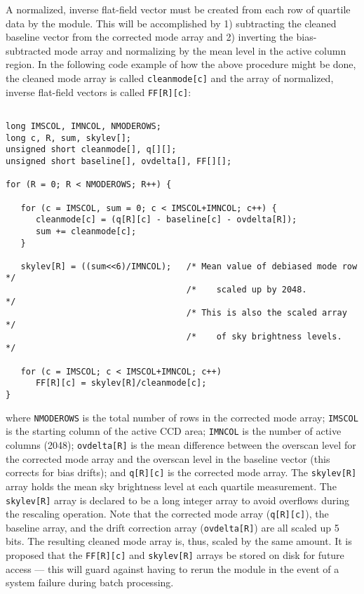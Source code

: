 A normalized, inverse flat-field vector must be created from
each row of quartile data by the \icfrm module. This will be accomplished
by 1) subtracting the cleaned baseline vector
from the corrected mode array and 2) inverting the bias-subtracted
mode array and normalizing by the mean level in the active
column region. In the following code example of how the above
procedure might be done, the cleaned mode array is called
{\tt cleanmode[c]} and the array of normalized, inverse flat-field
vectors is called {\tt FF[R][c]}:

\begin{verbatim}

long IMSCOL, IMNCOL, NMODEROWS;
long c, R, sum, skylev[];
unsigned short cleanmode[], q[][];
unsigned short baseline[], ovdelta[], FF[][];

for (R = 0; R < NMODEROWS; R++) {

   for (c = IMSCOL, sum = 0; c < IMSCOL+IMNCOL; c++) {
      cleanmode[c] = (q[R][c] - baseline[c] - ovdelta[R]);
      sum += cleanmode[c];
   }

   skylev[R] = ((sum<<6)/IMNCOL);   /* Mean value of debiased mode row */
                                    /*    scaled up by 2048.           */
                                    /* This is also the scaled array   */
                                    /*    of sky brightness levels.    */

   for (c = IMSCOL; c < IMSCOL+IMNCOL; c++) 
      FF[R][c] = skylev[R]/cleanmode[c]; 
}

\end{verbatim}

\noindent where {\tt NMODEROWS} is the total number of rows in the 
corrected mode array; 
{\tt IMSCOL} is the starting column of the active
CCD area; {\tt IMNCOL} is the number of active columns
(2048); {\tt ovdelta[R]} is the mean difference between the  
overscan level for the corrected mode array and the
overscan level in the baseline vector (this corrects for bias
drifts); and {\tt q[R][c]} is the corrected mode array.
The {\tt skylev[R]} array holds the mean sky brightness level
at each quartile measurement. The {\tt skylev[R]} array is
declared to be a long integer array to avoid overflows during
the rescaling operation.
Note that the corrected mode array ({\tt q[R][c]}), the baseline array,
and the drift correction array ({\tt ovdelta[R]}) are all scaled up 5 bits.
The resulting cleaned mode array is, thus, scaled by the same amount.
It is proposed that the {\tt FF[R][c]} and {\tt skylev[R]}
arrays be stored on
disk for future access --- this will guard against having to rerun
the \icfrm module in the event of a system failure during
\cfrm batch processing.

